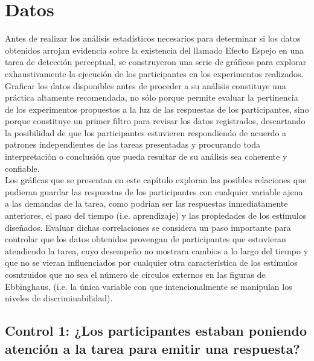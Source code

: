 
\chapter{Datos} %

\label{Cap_Data} %


Antes de realizar los análisis estadísticos necesarios para determinar si los datos obtenidos arrojan evidencia sobre la existencia del llamado Efecto Espejo en una tarea de detección perceptual, se construyeron una serie de gráficos para explorar exhaustivamente la ejecución de los participantes en los experimentos realizados. Graficar los datos disponibles antes de proceder a su análisis constituye una práctica altamente recomendada, no sólo porque permite evaluar la pertinencia de los experimentos propuestos a la luz de las respuestas de los participantes, sino porque constituye un primer filtro para revisar los datos registrados, descartando la posibilidad de que los participantes estuvieren respondiendo de acuerdo a patrones independientes de las tareas presentadas y procurando toda interpretación o conclusión que pueda resultar de su análisis sea coherente y confiable.\\

Los gráficas que se presentan en este capítulo exploran las posibles relaciones que pudieran guardar las respuestas de los participantes con cualquier variable ajena a las demandas de la tarea, como podrían ser las respuestas inmediatamente anteriores, el paso del tiempo (i.e. aprendizaje) y las propiedades de los estímulos diseñados. Evaluar dichas correlaciones se considera un paso importante para controlar que los datos obtenidos provengan de participantes que estuvieran atendiendo la tarea, cuyo desempeño no mostrara cambios a lo largo del tiempo y que no se vieran influenciados por cualquier otra característica de los estímulos cosntruidos que no sea el número de círculos externos en las figuras de Ebbinghaus, (i.e. la única variable con que intencionalmente se manipulan los niveles de discriminabilidad).\\


\section{Control 1: ¿Los participantes estaban poniendo atención a la tarea para emitir una respuesta?}

